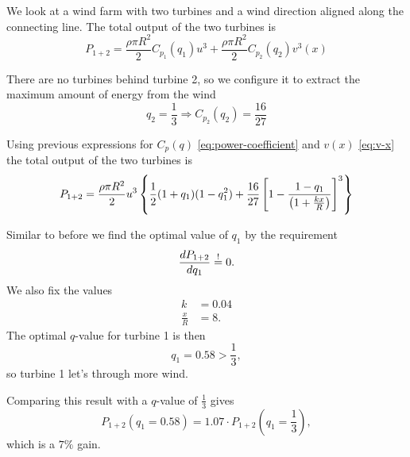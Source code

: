We look at a wind farm with two turbines and a wind direction aligned along the connecting line. The total output of the two turbines is
\begin{equation}
P_{1+2} = \frac{\rho\pi R^2}{2}C_{p_1}(q_1)u^3 + \frac{\rho\pi R^2}{2}C_{p_2}(q_2)v^3(x)
\end{equation}

There are no turbines behind turbine 2, so we configure it to extract the maximum amount of energy from the wind
\begin{equation}
q_2=\frac{1}{3} \Rightarrow C_{p_2}(q_2) = \frac{16}{27}
\end{equation}

Using previous expressions for $C_p(q)$ \eqref{eq:power-coefficient} and $v(x)$ \eqref{eq:v-x} the total output of the two turbines is
\begin{equation}
P_{1+2} = \frac{\rho\pi R^2}{2}u^3 \left\{\frac{1}{2}(1+q_1)(1-q_1^2) + \frac{16}{27}\left[1-\frac{1-q_1}{\left(1+\frac{kx}{R}\right)} \right]^3 \right\}
\end{equation}

Similar to before we find the optimal value of $q_1$ by the requirement
\begin{equation}
\frac{d P_{1+2}}{d q_1} \overset{!}{=} 0.
\end{equation}
We also fix the values
\begin{align*}
k &= 0.04\\
\frac{x}{R} &= 8.
\end{align*}
The optimal $q$-value for turbine 1 is then
\begin{equation}
q_1 = 0.58 > \frac{1}{3},
\end{equation}
so turbine 1 let's through more wind.

Comparing this result with a $q$-value of $\frac{1}{3}$ gives
\begin{equation}
P_{1+2}(q_1=0.58) = 1.07 \cdot P_{1+2}\left(q_1=\frac{1}{3}\right),
\end{equation}
which is a $7\%$ gain.
